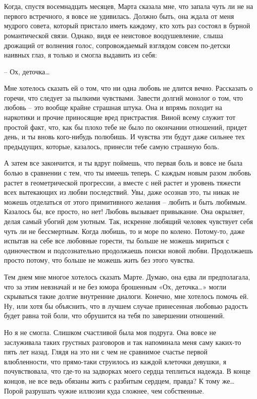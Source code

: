 \documentclass[
]{book}
\begin{document}
\hypertarget{chapter-35}{%
\chapter{~}\label{chapter-35}}

Когда, спустя восемнадцать месяцев, Марта сказала мне, что запала чуть ли не на первого встречного, я вовсе не удивилась. Должно быть, она ждала от меня мудрого совета, который пристало иметь каждому, кто хоть раз состоял в бурной романтической связи. Однако, видя ее неистовое воодушевление, слыша дрожащий от волнения голос, сопровождаемый взглядом совсем по-детски наивных глаз, я только и смогла выдавить из себя:

-- Ох, деточка\ldots{}

Мне хотелось сказать ей о том, что ни одна любовь не длится вечно. Рассказать о горечи, что следует за пылкими чувствами. Завести долгий монолог о том, что любовь -- это вообще крайне страшная штука. Она и впрямь походит на наркотики и прочие приносящие вред пристрастия. Виной всему служит тот простой факт, что, как бы плохо тебе не было по окончании отношений, придет день, и ты вновь кого-нибудь полюбишь. И чувства эти будут даже сильнее тех предыдущих, которые, казалось, принесли тебе самую страшную боль.

А затем все закончится, и ты вдруг поймешь, что первая боль и вовсе не была болью в сравнении с тем, что ты имеешь теперь. С каждым новым разом любовь растет в геометрической прогрессии, а вместе с ней растет и уровень тяжести всех вытекающих из любви последствий. Увы, даже осознав это, ты никак не можешь отделаться от этого примитивного желания -- любить и быть любимым. Казалось бы, все просто, но нет! Любовь вызывает привыкание. Она окрыляет, делая самый убогий дом уютным. Так, искренне любящий человек чувствует себя чуть ли не бессмертным. Когда любишь, то и море по колено. Потому-то, даже испытав на себе все любовные горести, ты больше не можешь мириться с одиночеством и подсознательно продолжаешь поиски новой любви. Продолжаешь просто потому, что больше не можешь жить без этого чувства.

Тем днем мне многое хотелось сказать Марте. Думаю, она едва ли предполагала, что за этим невзначай и не без юмора брошенным «Ох, деточка\ldots» могли скрываться такие долгие внутренние диалоги. Конечно, мне хотелось помочь ей. Ну, или хотя бы объяснить, что в лучшем случае принесенная любовью радость будет равна той боли, что обрушится на тебя по завершении отношений.

Но я не смогла. Слишком счастливой была моя подруга. Она вовсе не заслуживала таких грустных разговоров и так напоминала меня саму каких-то пять лет назад. Глядя на это ни с чем не сравнимое счастье первой влюбленности, что прямо-таки струилось из каждой клеточки девушки, я почувствовала, что где-то на задворках моего сердца теплиться надежда. В конце концов, не все ведь обязаны жить с разбитым сердцем, правда? К тому же\ldots{} Порой разрушать чужие иллюзии куда сложнее, чем собственные.
\end{document}

